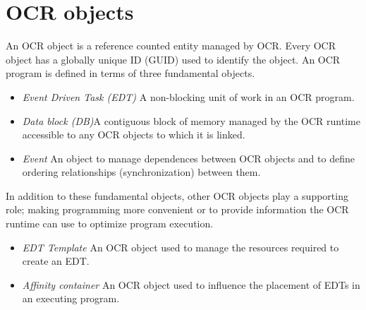 %

\section{OCR objects}
\label{sec:OCRobjects}


An OCR object is a reference counted entity managed by OCR. Every OCR
object has a globally unique ID (GUID) used to identify the
object. An OCR program is defined in terms of three fundamental objects.
\begin{itemize}
\item \emph{Event Driven Task (EDT)} A non-blocking unit of work in an OCR
program.
\item\emph{Data block (DB)}A contiguous block of memory managed by the
OCR runtime accessible to any OCR objects to which it is linked.
\item\emph{Event} An object to manage dependences between OCR objects and
to define ordering relationships (synchronization) between them.
\end{itemize}

In addition to these fundamental objects, other OCR objects
play a supporting role; making programming more convenient or
to provide information the OCR runtime can use to optimize program execution.
\begin{itemize}
\item \emph{EDT Template} An OCR object used to manage the resources
required to create an EDT.
\item \emph{Affinity container} An OCR object used to influence the
placement of EDTs in an executing program.
\end{itemize}

